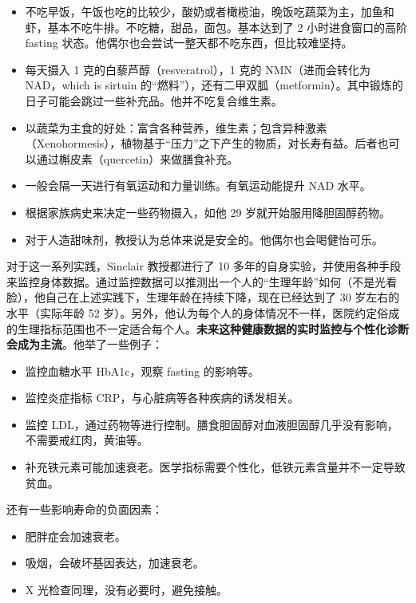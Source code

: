 \documentclass{report}
\begin{document}
\begin{itemize}
    \item 不吃早饭，午饭也吃的比较少，酸奶或者橄榄油，晚饭吃蔬菜为主，加鱼和虾，基本不吃牛排。不吃糖，甜品，面包。基本达到了 2 小时进食窗口的高阶 fasting 状态。他偶尔也会尝试一整天都不吃东西，但比较难坚持。
    \item 每天摄入 1 克的白藜芦醇（resveratrol），1 克的 NMN（进而会转化为 NAD，which is sirtuin 的“燃料”），还有二甲双胍（metformin）。其中锻炼的日子可能会跳过一些补充品。他并不吃复合维生素。
    \item 以蔬菜为主食的好处：富含各种营养，维生素；包含异种激素（Xenohormesis），植物基于“压力”之下产生的物质，对长寿有益。后者也可以通过槲皮素（quercetin）来做膳食补充。
    \item 一般会隔一天进行有氧运动和力量训练。有氧运动能提升 NAD 水平。
    \item 根据家族病史来决定一些药物摄入，如他 29 岁就开始服用降胆固醇药物。
    \item 对于人造甜味剂，教授认为总体来说是安全的。他偶尔也会喝健怡可乐。
\end{itemize}

对于这一系列实践，Sinclair 教授都进行了 10 多年的自身实验，并使用各种手段来监控身体数据。通过监控数据可以推测出一个人的“生理年龄”如何（不是光看脸），他自己在上述实践下，生理年龄在持续下降，现在已经达到了 30 岁左右的水平（实际年龄 52 岁）。另外，他认为每个人的身体情况不一样，医院约定俗成的生理指标范围也不一定适合每个人。\textbf{未来这种健康数据的实时监控与个性化诊断会成为主流}。他举了一些例子：

\begin{itemize}
    \item 监控血糖水平 HbA1c，观察 fasting 的影响等。
    \item 监控炎症指标 CRP，与心脏病等各种疾病的诱发相关。
    \item 监控 LDL，通过药物等进行控制。膳食胆固醇对血液胆固醇几乎没有影响，不需要戒红肉，黄油等。
    \item 补充铁元素可能加速衰老。医学指标需要个性化，低铁元素含量并不一定导致贫血。
\end{itemize}

还有一些影响寿命的负面因素：

\begin{itemize}
    \item 肥胖症会加速衰老。
    \item 吸烟，会破坏基因表达，加速衰老。
    \item X 光检查同理，没有必要时，避免接触。
\end{itemize}
\end{document}
